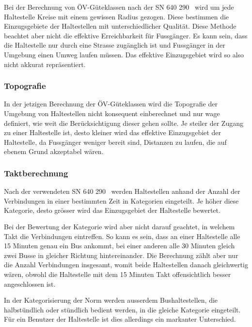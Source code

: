 Bei der Berechnung von \acs{ÖV}-Güteklassen nach der \acs{SN} 640 290~\cite{sn640290} wird um jede Haltestelle Kreise mit einem gewissen Radius gezogen.
Diese bestimmen die Einzugsgebiete der Haltestellen mit unterschiedlicher Qualität.
Diese Methode beachtet aber nicht die effektive Erreichbarkeit für Fussgänger.
Es kann sein, dass die Haltestelle nur durch eine Strasse zugänglich ist und Fussgänger in der Umgebung einen Umweg laufen müssen.
Das effektive Einzugsgebiet wird so also nicht akkurat repräsentiert.

\subsubsection{Topografie}
\label{Problemstellung:Topografie}

In der jetzigen Berechnung der \acs{ÖV}-Güteklassen wird die Topografie der Umgebung von Haltestellen nicht konsequent einberechnet und nur wage definiert, wie weit die Berücksichtigung dieser gehen sollte.
Je steiler der Zugang zu einer Haltestelle ist, desto kleiner wird das effektive Einzugsgebiet der Haltestelle, da Fussgänger weniger bereit sind, Distanzen zu laufen, die auf ebenem Grund akzeptabel wären.

\subsubsection{Taktberechnung}
\label{Problemstellung:Taktberechnung}

Nach der verwendeten \acs{SN} 640 290~\cite{sn640290} werden Haltestellen anhand der Anzahl der Verbindungen in einer bestimmten Zeit in Kategorien eingeteilt.
Je höher diese Kategorie, desto grösser wird das Einzugsgebiet der Haltestelle bewertet.

Bei der Bewertung der Kategorie wird aber nicht darauf geachtet, in welchem Takt die Verbindungen eintreffen.
So kann es sein, dass an einer Haltestelle alle 15 Minuten genau ein Bus ankommt, bei einer anderen alle 30 Minuten gleich zwei Busse in gleicher Richtung hintereinander.
Die Berechnung zählt aber nur die Anzahl Verbindungen insgesamt, womit beide Haltestellen danach gleichwertig wären, obwohl die Haltestelle mit dem 15 Minuten Takt offensichtlich besser angeschlossen ist.

In der Kategorisierung der Norm werden ausserdem Bushaltestellen, die halbstündlich oder stündlich bedient werden, in die gleiche Kategorie eingeteilt.
Für ein Benutzer der Haltestelle ist dies allerdings ein markanter Unterschied.

